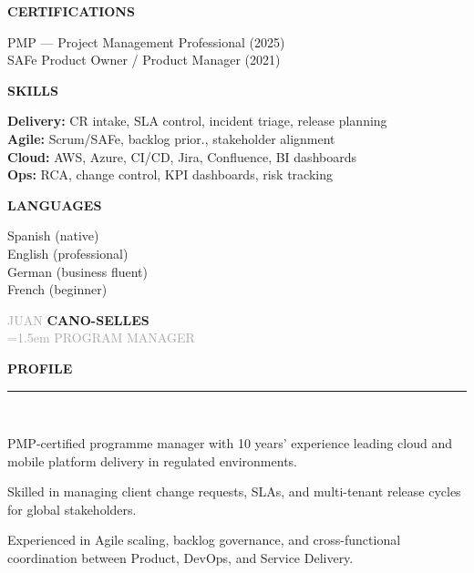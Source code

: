 \documentclass[12pt,a4paper]{article}
\newcommand{\headleft}[1]{%
  \vspace*{2ex}\textsc{\textbf{\color{softwhite}#1}}\par%
  \vspace*{-1.2ex}{\color{softwhite}\hrulefill}\par\vspace*{0.8ex}
}
\newcommand{\headright}[1]{%
  \vspace{0.6ex}%
  {\sffont\bfseries\large\addfontfeatures{LetterSpace=2.0}\textcolor{cvblue}{\MakeUppercase{#1}}}\\[-1ex]%
  {\color{cvblue}\rule{\dimexpr\linewidth\relax}{0.6pt}}\\[-0.4ex]%
}
\newlength{\SideBarW}
\begin{document}
\begin{minipage}[t]{\textwidth}
{{\begin{minipage}[t]{\dimexpr\linewidth-8mm\relax}
      \vspace*{3mm}

      \headleft{CERTIFICATIONS}
      PMP — Project Management Professional (2025)\\[0.6ex]
      SAFe Product Owner / Product Manager (2021)

      \vspace*{3mm}

      \headleft{SKILLS}
      \textbf{Delivery:} CR intake, SLA control, incident triage, release planning\\[0.4ex]
      \textbf{Agile:} Scrum/SAFe, backlog prior., stakeholder alignment\\[0.4ex]
      \textbf{Cloud:} AWS, Azure, CI/CD, Jira, Confluence, BI dashboards\\[0.4ex]
      \textbf{Ops:} RCA, change control, KPI dashboards, risk tracking

      \vspace*{3mm}

      \headleft{LANGUAGES}
      Spanish (native)\\[0.4ex]
      English (professional)\\[0.4ex]
      German (business fluent)\\[0.4ex]
      French (beginner)

    \end{minipage}
  }%
}%
\hspace{4mm}%
\begin{minipage}[t]{\dimexpr\textwidth-\SideBarW-4mm\relax}
  \raggedright
  \setlength{\parskip}{0.55ex}

\vspace*{14mm}
\begin{center}
  {\sffont\fontsize{40}{42}\textcolor{darkgray}{JUAN}}%
  \hspace{1.2em}%
  {\sffont\fontsize{40}{42}\bfseries{}\textcolor{cvblue}{CANO-SELLES}}\\[2ex]
  {\sffont\fontsize{16}{18}\textcolor{darkgray}{\spaceskip=1.5em PROGRAM MANAGER}}
\end{center}

\vspace{3mm}

\headright{Profile}
\vspace*{-0.4ex}
\begin{cvitemize}
  \item PMP-certified programme manager with 10 years’ experience leading cloud and mobile platform delivery in regulated environments.
  \item Skilled in managing client change requests, SLAs, and multi-tenant release cycles for global stakeholders.
  \item Experienced in Agile scaling, backlog governance, and cross-functional coordination between Product, DevOps, and Service Delivery.
\end{cvitemize}


\end{minipage}
\end{minipage}
\end{document}

